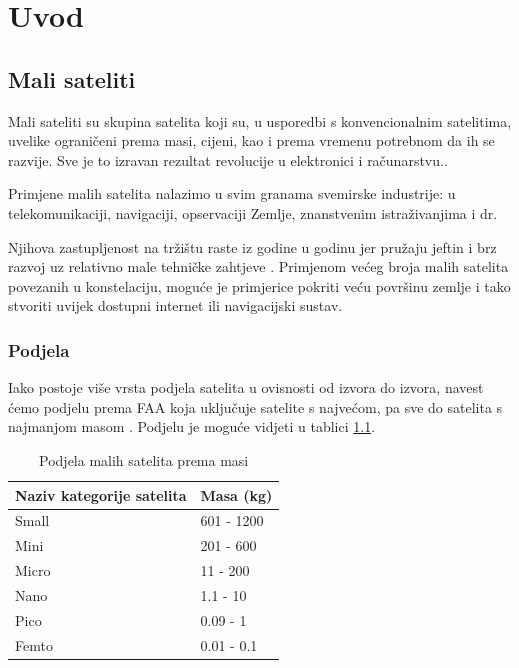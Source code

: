 \documentclass[times, utf8, diplomski, numeric]{templates/template}
\begin{document}
\chapter{Uvod}{
    \section{Mali sateliti}{
        Mali sateliti su skupina satelita koji su, u usporedbi s konvencionalnim satelitima, uvelike ograničeni prema masi, cijeni, kao i prema vremenu potrebnom da ih se razvije. Sve je to izravan rezultat revolucije u elektronici i računarstvu.\cite{hrvatskiVojnik}.

        Primjene malih satelita nalazimo u svim granama svemirske industrije: u telekomunikaciji, navigaciji, opservaciji Zemlje, znanstvenim istraživanjima i dr.
        
        Njihova zastupljenost na tržištu raste iz godine u godinu jer pružaju jeftin i brz razvoj uz relativno male tehničke zahtjeve \cite{rastMalihSatelita}. Primjenom većeg broja malih satelita povezanih u konstelaciju, moguće je primjerice pokriti veću površinu zemlje i tako stvoriti uvijek dostupni internet ili navigacijski sustav.
        
        \subsection{Podjela}{
            Iako postoje više vrsta podjela satelita u ovisnosti od izvora do izvora, navest ćemo podjelu prema FAA  koja uključuje satelite s najvećom, pa sve do satelita s najmanjom masom \cite{podjelaPremaMasi}. Podjelu je moguće vidjeti u tablici \ref{tbl:podjelaSatelita}.

            \begin{table}[htb]
            \caption{Podjela malih satelita prema masi}
            \label{tbl:podjelaSatelita}
            \centering
            \begin{tabular}{ll} \toprule
            Naziv kategorije satelita & Masa (kg) \\ \midrule
            Small & 601 - 1200 \\
            Mini & 201 - 600 \\
            Micro & 11 - 200 \\
            Nano & 1.1 - 10 \\
            Pico & 0.09 - 1 \\
            Femto & 0.01 - 0.1 \\ \bottomrule
            \end{tabular}
            \end{table}

}}}
\end{document}
